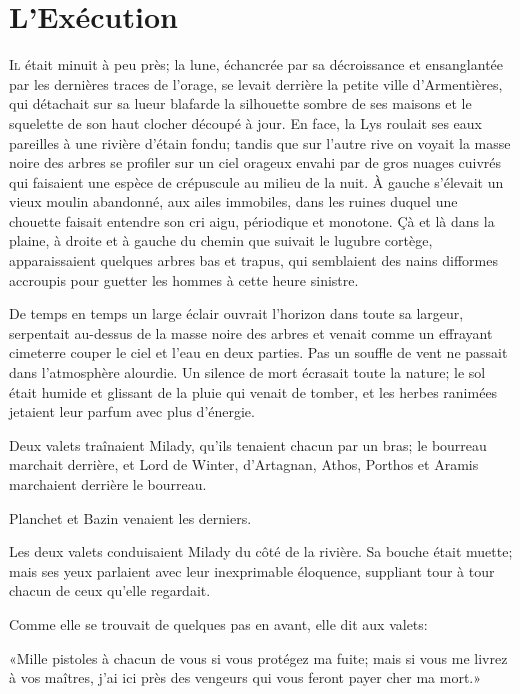 
\chapter{L'Exécution}

\lettrine{I}{l} était minuit à peu près; la lune, échancrée par sa décroissance et ensanglantée par les dernières traces de l'orage, se levait derrière la petite ville d'Armentières, qui détachait sur sa lueur blafarde la silhouette sombre de ses maisons et le squelette de son haut clocher découpé à jour. En face, la Lys roulait ses eaux pareilles à une rivière d'étain fondu; tandis que sur l'autre rive on voyait la masse noire des arbres se profiler sur un ciel orageux envahi par de gros nuages cuivrés qui faisaient une espèce de crépuscule au milieu de la nuit. À gauche s'élevait un vieux moulin abandonné, aux ailes immobiles, dans les ruines duquel une chouette faisait entendre son cri aigu, périodique et monotone. Çà et là dans la plaine, à droite et à gauche du chemin que suivait le lugubre cortège, apparaissaient quelques arbres bas et trapus, qui semblaient des nains difformes accroupis pour guetter les hommes à cette heure sinistre. 

De temps en temps un large éclair ouvrait l'horizon dans toute sa largeur, serpentait au-dessus de la masse noire des arbres et venait comme un effrayant cimeterre couper le ciel et l'eau en deux parties. Pas un souffle de vent ne passait dans l'atmosphère alourdie. Un silence de mort écrasait toute la nature; le sol était humide et glissant de la pluie qui venait de tomber, et les herbes ranimées jetaient leur parfum avec plus d'énergie. 

Deux valets traînaient Milady, qu'ils tenaient chacun par un bras; le bourreau marchait derrière, et Lord de Winter, d'Artagnan, Athos, Porthos et Aramis marchaient derrière le bourreau. 

Planchet et Bazin venaient les derniers. 

Les deux valets conduisaient Milady du côté de la rivière. Sa bouche était muette; mais ses yeux parlaient avec leur inexprimable éloquence, suppliant tour à tour chacun de ceux qu'elle regardait. 

Comme elle se trouvait de quelques pas en avant, elle dit aux valets: 

«Mille pistoles à chacun de vous si vous protégez ma fuite; mais si vous me livrez à vos maîtres, j'ai ici près des vengeurs qui vous feront payer cher ma mort.» 


